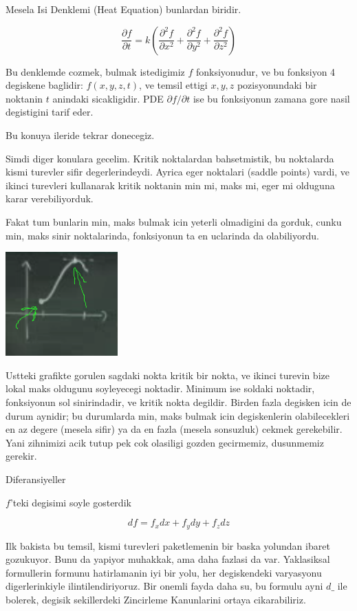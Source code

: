 \documentclass[12pt,fleqn]{article}
\begin{document}
Mesela Isi Denklemi (Heat Equation) bunlardan biridir. 

\[ \frac{\partial f}{\partial t}  = k (
\frac{\partial^2 f}{\partial x^2} + 
\frac{\partial^2 f}{\partial y^2} + 
\frac{\partial^2 f}{\partial z^2} )
\]

Bu denklemde cozmek, bulmak istedigimiz $f$ fonksiyonudur, ve bu
fonksiyon 4 degiskene baglidir: $f(x,y,z,t)$, ve temsil ettigi $x,y,z$
pozisyonundaki bir noktanin $t$ anindaki sicakligidir. PDE
$\partial f/\partial t$ ise bu fonksiyonun zamana gore nasil degistigini
tarif eder. 

Bu konuya ileride tekrar donecegiz. 

Simdi diger konulara gecelim. Kritik noktalardan bahsetmistik, bu
noktalarda kismi turevler sifir degerlerindeydi. Ayrica eger noktalari
(saddle points) vardi, ve ikinci turevleri kullanarak kritik noktanin min
mi, maks mi, eger mi  olduguna karar verebiliyorduk. 

Fakat tum bunlarin min, maks bulmak icin yeterli olmadigini da gorduk,
cunku min, maks sinir noktalarinda, fonksiyonun ta en uclarinda da
olabiliyordu. 

\includegraphics[height=4cm]{15_1.png}

Ustteki grafikte gorulen sagdaki nokta kritik bir nokta, ve ikinci turevin
bize lokal maks oldugunu soyleyecegi noktadir. Minimum ise soldaki
noktadir, fonksiyonun sol sinirindadir, ve kritik nokta degildir. Birden
fazla degisken icin de durum aynidir; bu durumlarda min, maks bulmak icin
degiskenlerin olabilecekleri en az degere (mesela sifir) ya da en fazla
(mesela sonsuzluk) cekmek gerekebilir. Yani zihnimizi acik tutup pek cok
olasiligi gozden gecirmemiz, dusunmemiz gerekir. 

Diferansiyeller 

$f$'teki degisimi soyle gosterdik

\[ df = f_xdx + f_ydy + f_zdz  \]

Ilk bakista bu temsil, kismi turevleri paketlemenin bir baska yolundan
ibaret gozukuyor. Bunu da yapiyor muhakkak, ama daha fazlasi da
var. Yaklasiksal formullerin formunu hatirlamanin iyi bir yolu, her
degiskendeki varyasyonu digerlerinkiyle ilintilendiriyoruz. Bir onemli
fayda daha su, bu formulu ayni $d\_$ ile bolerek, degisik sekillerdeki
Zincirleme Kanunlarini ortaya cikarabiliriz. 
\end{document}
